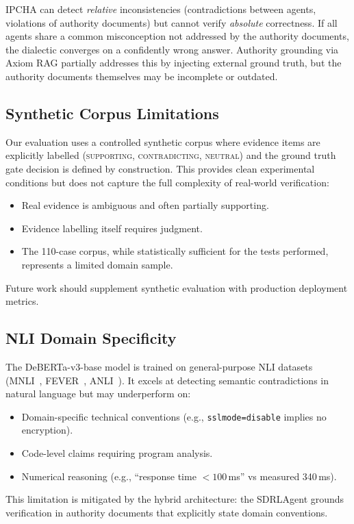\documentclass[11pt,a4paper]{article}
\begin{document}
IPCHA can detect \emph{relative} inconsistencies (contradictions
between agents, violations of authority documents) but cannot verify
\emph{absolute} correctness.  If all agents share a common
misconception not addressed by the authority documents, the dialectic
converges on a confidently wrong answer.  Authority grounding via
Axiom RAG partially addresses this by injecting external ground
truth, but the authority documents themselves may be incomplete or
outdated.

\subsection{Synthetic Corpus Limitations}

Our evaluation uses a controlled synthetic corpus where evidence
items are explicitly labelled (\textsc{supporting},
\textsc{contradicting}, \textsc{neutral}) and the ground truth gate
decision is defined by construction.  This provides clean
experimental conditions but does not capture the full complexity of
real-world verification:
\begin{itemize}[leftmargin=*]
  \item Real evidence is ambiguous and often partially supporting.
  \item Evidence labelling itself requires judgment.
  \item The 110-case corpus, while statistically sufficient for the
        tests performed, represents a limited domain sample.
\end{itemize}
Future work should supplement synthetic evaluation with production
deployment metrics.

\subsection{NLI Domain Specificity}

The DeBERTa-v3-base model is trained on general-purpose NLI datasets
(MNLI~\cite{williams2018mnli}, FEVER~\cite{thorne2018fever},
ANLI~\cite{nie2020anli}).  It excels at detecting semantic
contradictions in natural language but may underperform on:
\begin{itemize}[leftmargin=*]
  \item Domain-specific technical conventions (e.g.,
        \texttt{sslmode=disable} implies no encryption).
  \item Code-level claims requiring program analysis.
  \item Numerical reasoning (e.g., ``response time $< 100$\,ms'' vs
        measured 340\,ms).
\end{itemize}
This limitation is mitigated by the hybrid architecture: the
SDRLAgent grounds verification in authority documents that explicitly
state domain conventions.
\end{document}
